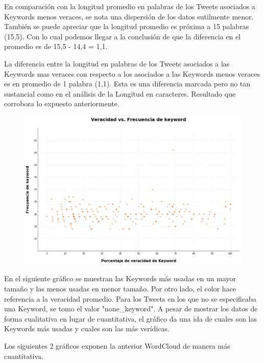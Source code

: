 \documentclass[titlepage,a4paper]{article}
\begin{document}
    En comparación con la longitud promedio en palabras de los Tweets asociados a Keywords menos veraces, se nota una dispersión de los datos sutilmente menor. También se puede apreciar que la longitud promedio es próxima a 15 palabras (15,5). Con lo cual podemos llegar a la conclusión de que la diferencia en el promedio es de 15,5 - 14,4 = 1,1.
    
    La diferencia entre la longitud en palabras de los Tweets asociados a las Keywords mas veraces con respecto a los asociados a las Keywords menos veraces es en promedio de 1 palabra (1,1). Esta es una diferencia marcada pero no tan sustancial como en el análisis de la Longitud en caracteres. Resultado que corrobora lo expuesto anteriormente.
    
    \begin{figure}[H]
    \centering
    \includegraphics[width=1\textwidth]{graficos/Analisis de Keyword/veracidad_vs_frec_de_keyword.png}
    \caption{} 
    \end{figure}
    
    En el siguiente gráfico se muestran las Keywords más usadas en un mayor tamaño y las menos usadas en menor tamaño. Por otro lado, el color hace referencia a la veracidad promedio. Para los Tweets en los que no se especificaba una Keyword, se tomo el valor "none\_keyword". A pesar de mostrar los datos de forma cualitativa en lugar de cuantitativa, el gráfico da una ida de cuales son las Keywords más usadas y cuales son las más verídicas. 
    
    Los siguientes 2 gráficos exponen la anterior WordCloud de manera más cuantitativa.
    
    
    
\end{document}
